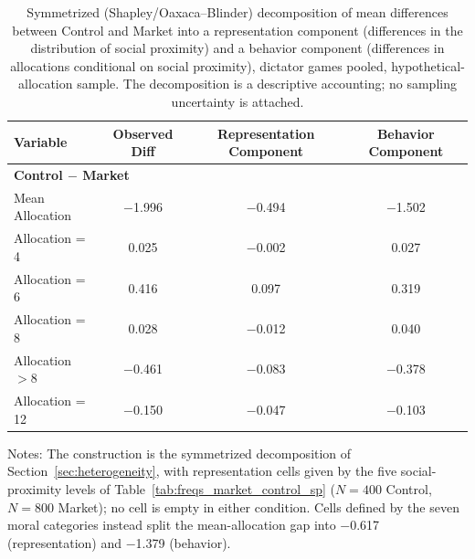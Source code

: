 \begin{table}[!htbp]
\centering
\caption{Symmetrized (Shapley/Oaxaca--Blinder) decomposition of mean differences between Control and Market into a representation component (differences in the distribution of social proximity) and a behavior component (differences in allocations conditional on social proximity), dictator games pooled, hypothetical-allocation sample. The decomposition is a descriptive accounting; no sampling uncertainty is attached.}
\label{tab:decomposition_sym_pooled_m0m1}
\begin{tabular}{lccc}
\toprule
\textbf{Variable} & \textbf{Observed Diff} & \textbf{Representation Component} & \textbf{Behavior Component} \\
\midrule
\multicolumn{4}{l}{\textbf{Control $-$ Market}} \\
Mean Allocation    & $-$1.996 & $-$0.494 & $-$1.502 \\
Allocation = 4     & 0.025 & $-$0.002 & 0.027 \\
Allocation = 6     & 0.416 & 0.097 & 0.319 \\
Allocation = 8     & 0.028 & $-$0.012 & 0.040 \\
Allocation $>8$    & $-$0.461 & $-$0.083 & $-$0.378 \\
Allocation = 12    & $-$0.150 & $-$0.047 & $-$0.103 \\
\bottomrule
\end{tabular}
\begin{flushleft}
\footnotesize Notes: The construction is the symmetrized decomposition of Section~\ref{sec:heterogeneity}, with representation cells given by the five social-proximity levels of Table~\ref{tab:freqs_market_control_sp} ($N=400$ Control, $N=800$ Market); no cell is empty in either condition. Cells defined by the seven moral categories instead split the mean-allocation gap into $-$0.617 (representation) and $-$1.379 (behavior).
\end{flushleft}
\end{table}
